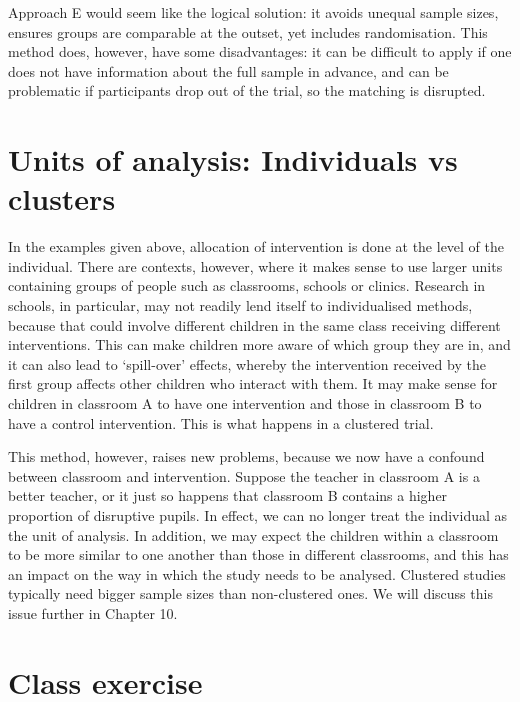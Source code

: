 \documentclass[]{book}
\begin{document}
Approach E would seem like the logical solution: it avoids unequal sample sizes, ensures groups are comparable at the outset, yet includes randomisation. This method does, however, have some disadvantages: it can be difficult to apply if one does not have information about the full sample in advance, and can be problematic if participants drop out of the trial, so the matching is disrupted.

\hypertarget{units-of-analysis-individuals-vs-clusters}{%
\section{Units of analysis: Individuals vs clusters}\label{units-of-analysis-individuals-vs-clusters}}

In the examples given above, allocation of intervention is done at the level of the individual. There are contexts, however, where it makes sense to use larger units containing groups of people such as classrooms, schools or clinics. Research in schools, in particular, may not readily lend itself to individualised methods, because that could involve different children in the same class receiving different interventions. This can make children more aware of which group they are in, and it can also lead to `spill-over' effects, whereby the intervention received by the first group affects other children who interact with them. It may make sense for children in classroom A to have one intervention and those in classroom B to have a control intervention. This is what happens in a clustered trial.

This method, however, raises new problems, because we now have a confound between classroom and intervention. Suppose the teacher in classroom A is a better teacher, or it just so happens that classroom B contains a higher proportion of disruptive pupils. In effect, we can no longer treat the individual as the unit of analysis. In addition, we may expect the children within a classroom to be more similar to one another than those in different classrooms, and this has an impact on the way in which the study needs to be analysed. Clustered studies typically need bigger sample sizes than non-clustered ones. We will discuss this issue further in Chapter 10.

\hypertarget{class-exercise-3}{%
\section{Class exercise}\label{class-exercise-3}}
\end{document}
